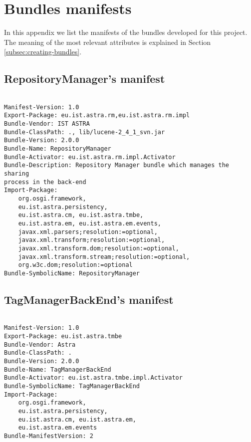 \chapter{Bundles manifests}
\label{appendix:manifests}

In this appendix we list the manifests of the bundles developed for this
project. The meaning of the most relevant attributes is explained in Section
\ref{subsec:creating-bundles}.

\section{RepositoryManager's manifest}

\begin{verbatim}

Manifest-Version: 1.0
Export-Package: eu.ist.astra.rm,eu.ist.astra.rm.impl
Bundle-Vendor: IST ASTRA
Bundle-ClassPath: ., lib/lucene-2_4_1_svn.jar
Bundle-Version: 2.0.0
Bundle-Name: RepositoryManager
Bundle-Activator: eu.ist.astra.rm.impl.Activator
Bundle-Description: Repository Manager bundle which manages the sharing
process in the back-end
Import-Package: 
	org.osgi.framework, 
	eu.ist.astra.persistency, 
	eu.ist.astra.cm, eu.ist.astra.tmbe, 
	eu.ist.astra.em, eu.ist.astra.em.events, 
	javax.xml.parsers;resolution:=optional, 
	javax.xml.transform;resolution:=optional, 
	javax.xml.transform.dom;resolution:=optional, 
	javax.xml.transform.stream;resolution:=optional, 
	org.w3c.dom;resolution:=optional
Bundle-SymbolicName: RepositoryManager

\end{verbatim}

\section{TagManagerBackEnd's manifest}

\begin{verbatim}

Manifest-Version: 1.0
Export-Package: eu.ist.astra.tmbe
Bundle-Vendor: Astra
Bundle-ClassPath: .
Bundle-Version: 2.0.0
Bundle-Name: TagManagerBackEnd
Bundle-Activator: eu.ist.astra.tmbe.impl.Activator
Bundle-SymbolicName: TagManagerBackEnd
Import-Package: 
	org.osgi.framework, 
	eu.ist.astra.persistency, 
	eu.ist.astra.cm, eu.ist.astra.em, 
	eu.ist.astra.em.events
Bundle-ManifestVersion: 2



\end{verbatim}

